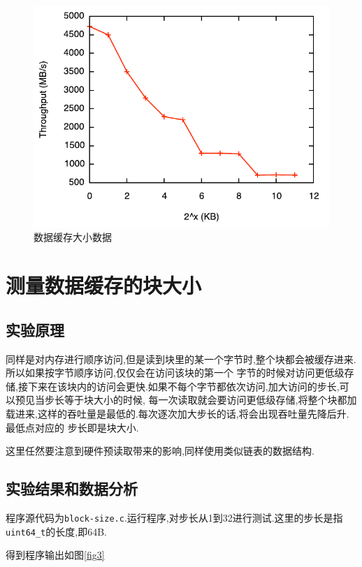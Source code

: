 \documentclass[adobefonts, nocap]{ctexart}
\begin{document}
      \begin{figure}[htbp]
        \includegraphics[width=12cm]{2.pdf}
        \caption{数据缓存大小数据}
        \label{fig2}
      \end{figure}
      \clearpage
  \section{测量数据缓存的块大小}
    \subsection{实验原理}
      同样是对内存进行顺序访问,但是读到块里的某一个字节时,整个块都会被缓存进来.所以如果按字节顺序访问,仅仅会在访问该块的第一个
      字节的时候对访问更低级存储,接下来在该块内的访问会更快.如果不每个字节都依次访问,加大访问的步长,可以预见当步长等于块大小的时候,
      每一次读取就会要访问更低级存储,将整个块都加载进来,这样的吞吐量是最低的.每次逐次加大步长的话,将会出现吞吐量先降后升.最低点对应的
      步长即是块大小.

      这里任然要注意到硬件预读取带来的影响,同样使用类似链表的数据结构.
    \subsection{实验结果和数据分析}
      程序源代码为\texttt{block-size.c}.运行程序,对步长从1到32进行测试.这里的步长是指\texttt{uint64\_t}的长度,即64B.

      得到程序输出如图\ref{fig3}
\end{document}
